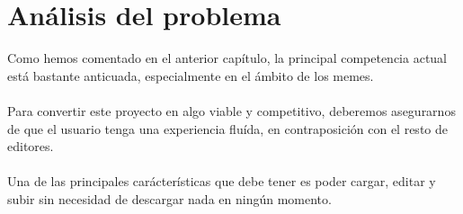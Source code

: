 \chapter{Análisis del problema}
 


Como hemos comentado en el anterior capítulo, la principal competencia actual está 
bastante anticuada, especialmente en el ámbito de los memes.
\\\\
Para convertir este proyecto en algo viable y competitivo, deberemos asegurarnos de que
el usuario tenga una experiencia fluída, en contraposición con el resto de editores.
\\\\
Una de las principales carácterísticas que debe tener es poder cargar, editar y subir sin
necesidad de descargar nada en ningún momento.